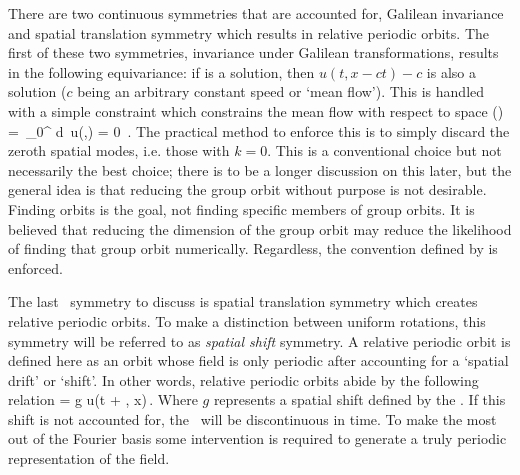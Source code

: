 There are two continuous symmetries that are accounted for, Galilean invariance and spatial translation symmetry which
results in relative periodic orbits.
The first of these two symmetries, invariance under Galilean transformations, results in the following equivariance:
if \ufield is a solution, then $u(t, x - ct) - c$ is also a solution ($c$ being an arbitrary constant speed or `mean flow').
This is handled with a simple constraint which constrains the mean flow with respect to space
\beq
{}(\zeit)
  \,=\, \int_0^{\speriod{}} d\conf \, u(\conf,\zeit) = 0
\,.
The practical method to enforce this is to simply discard the zeroth spatial modes, i.e. those with $k=0$.
This is a conventional choice but not necessarily the best choice; there is to be a longer discussion on this later,
but the general idea is that reducing the group orbit without purpose is not desirable. Finding orbits is the
goal, not finding specific members of group orbits. It is believed that reducing the dimension of the group orbit may
reduce the likelihood of finding that group orbit numerically. Regardless, the convention defined by 
is enforced.

The last \spt\ symmetry to discuss is spatial translation symmetry which creates relative periodic orbits. To
make a distinction between uniform rotations, this symmetry will be referred to as \textit{spatial shift} symmetry.
A relative periodic orbit is defined here as an orbit whose field \dufield is only
periodic after accounting for a `spatial drift' or `shift'. In other words, relative
periodic orbits abide by the following relation
\beq
\ufield = g \circ u(t + \period{}, x)\,.
\eeq
Where $g$ represents a spatial shift defined by the \goveqn.
If this shift is not accounted for, the \ufield\ will be discontinuous in time.
To make the most out of the Fourier basis some intervention is required to generate
a truly periodic representation of the field.

